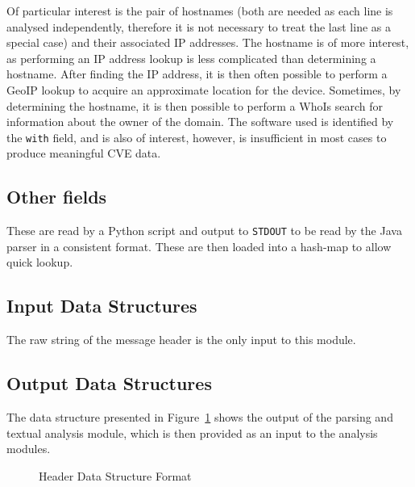 Of particular interest is the pair of hostnames (both are needed as each line
is analysed independently, therefore it is not necessary to treat the last line
as a special case) and their associated IP addresses.  The hostname is of more
interest, as performing an IP address lookup is less complicated than
determining a hostname.  After finding the IP address, it is then often
possible to perform a GeoIP lookup to acquire an approximate location for the
device. Sometimes, by determining the hostname, it is then possible to perform
a WhoIs search for information about the owner of the domain. The software used
is identified by the \texttt{with} field, and is also of interest, however, is
insufficient in most cases to produce meaningful CVE data.

\subsection{Other fields}

These are read by a Python script and output to \texttt{STDOUT} to be read by
the Java parser in a consistent format.  These are then loaded into a hash-map to
allow quick lookup.


\subsection{Input Data Structures}
The raw string of the message header is the only input to this module.

\subsection{Output Data Structures}
The data structure presented in Figure~\ref{fig:hea} shows the output of the
parsing and textual analysis module, which is then provided as an input to the
analysis modules.

\begin{figure}
\centering
{}
	\caption{Header Data Structure Format}
	\label{fig:hea}
\end{figure}



